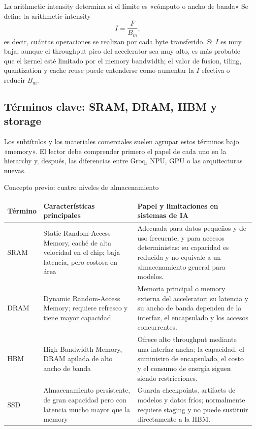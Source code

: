 \begin{importantbox}{La arithmetic intensity determina si el límite es «cómputo o ancho de banda»}
Se define la arithmetic intensity
\[
I=\frac{F}{B_m},
\]
es decir, cuántas operaciones se realizan por cada byte transferido. Si $I$ es muy baja, aunque el throughput pico del accelerator sea muy alto, es más probable que el kernel esté limitado por el memory bandwidth; el valor de fusion, tiling, quantization y cache reuse puede entenderse como aumentar la $I$ efectiva o reducir $B_m$.
\end{importantbox}

\subsection{Términos clave: SRAM, DRAM, HBM y storage}

Los subtítulos y los materiales comerciales suelen agrupar estos términos bajo «memory». El lector debe comprender primero el papel de cada uno en la hierarchy y, después, las diferencias entre Groq, NPU, GPU o las arquitecturas nuevas.

\begin{knowledgebox}{Concepto previo: cuatro niveles de almacenamiento}
\begin{tabularx}{\textwidth}{L{0.17\textwidth}L{0.24\textwidth}X}
\toprule
Término & Características principales & Papel y limitaciones en sistemas de IA \\
\midrule
SRAM & Static Random-Access Memory, caché de alta velocidad en el chip; baja latencia, pero costosa en área & Adecuada para datos pequeños y de uso frecuente, y para accesos deterministas; su capacidad es reducida y no equivale a un almacenamiento general para modelos. \\
DRAM & Dynamic Random-Access Memory; requiere refresco y tiene mayor capacidad & Memoria principal o memory externa del accelerator; su latencia y su ancho de banda dependen de la interfaz, el encapsulado y los accesos concurrentes. \\
HBM & High Bandwidth Memory, DRAM apilada de alto ancho de banda & Ofrece alto throughput mediante una interfaz ancha; la capacidad, el suministro de encapsulado, el costo y el consumo de energía siguen siendo restricciones. \\
SSD & Almacenamiento persistente, de gran capacidad pero con latencia mucho mayor que la memory & Guarda checkpoints, artifacts de modelos y datos fríos; normalmente requiere staging y no puede sustituir directamente a la HBM. \\
\bottomrule
\end{tabularx}
\end{knowledgebox}

